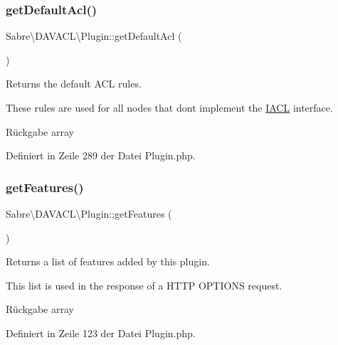 \subsubsection{\texorpdfstring{get\+Default\+Acl()}{getDefaultAcl()}}
{\footnotesize\ttfamily Sabre\textbackslash{}\+D\+A\+V\+A\+C\+L\textbackslash{}\+Plugin\+::get\+Default\+Acl (\begin{DoxyParamCaption}{ }\end{DoxyParamCaption})}

Returns the default A\+CL rules.

These rules are used for all nodes that don\textquotesingle{}t implement the \mbox{\hyperlink{interface_sabre_1_1_d_a_v_a_c_l_1_1_i_a_c_l}{I\+A\+CL}} interface.

\begin{DoxyReturn}{Rückgabe}
array 
\end{DoxyReturn}


Definiert in Zeile 289 der Datei Plugin.\+php.

\mbox{\label{class_sabre_1_1_d_a_v_a_c_l_1_1_plugin_a9c395319fa792d8fb9dad6c8c022e39a}} 
\subsubsection{\texorpdfstring{get\+Features()}{getFeatures()}}
{\footnotesize\ttfamily Sabre\textbackslash{}\+D\+A\+V\+A\+C\+L\textbackslash{}\+Plugin\+::get\+Features (\begin{DoxyParamCaption}{ }\end{DoxyParamCaption})}

Returns a list of features added by this plugin.

This list is used in the response of a H\+T\+TP O\+P\+T\+I\+O\+NS request.

\begin{DoxyReturn}{Rückgabe}
array 
\end{DoxyReturn}


Definiert in Zeile 123 der Datei Plugin.\+php.

\mbox{\label{class_sabre_1_1_d_a_v_a_c_l_1_1_plugin_a05ac25b54d2b0b24a6f6501f28b1e726}} 

